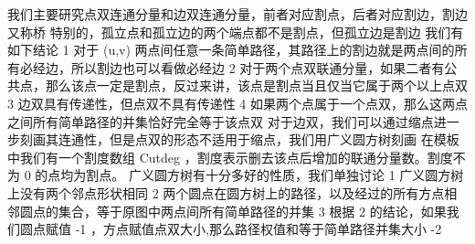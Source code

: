 {}
\markdownRendererSectionEnd 
\markdownRendererSectionEnd \markdownRendererSectionBegin
{}\markdownRendererInterblockSeparator
{}我们主要研究点双连通分量和边双连通分量，前者对应割点，后者对应割边，割边又称桥\markdownRendererParagraphSeparator
{}特别的，孤立点和孤立边的两个端点都不是割点，但孤立边是割边\markdownRendererParagraphSeparator
{}我们有如下结论\markdownRendererParagraphSeparator
{}\markdownRendererDollarSign{} 1 \markdownRendererDollarSign{}对于\markdownRendererDollarSign{} (u,v) \markdownRendererDollarSign{}两点间任意一条简单路径，其路径上的割边就是两点间的所有必经边，所以割边也可以看做必经边\markdownRendererParagraphSeparator
{}\markdownRendererDollarSign{} 2 \markdownRendererDollarSign{}对于两个点双联通分量，如果二者有公共点，那么该点一定是割点，反过来讲，该点是割点当且仅当它属于两个以上点双\markdownRendererParagraphSeparator
{}\markdownRendererDollarSign{} 3 \markdownRendererDollarSign{}边双具有传递性，但点双不具有传递性\markdownRendererParagraphSeparator
{}\markdownRendererDollarSign{} 4 \markdownRendererDollarSign{}如果两个点属于一个点双，那么这两点之间所有简单路径的并集恰好完全等于该点双\markdownRendererParagraphSeparator
{}对于边双，我们可以通过缩点进一步刻画其连通性，但是点双的形态不适用于缩点，我们用广义圆方树刻画\markdownRendererInterblockSeparator
{}\markdownRendererSectionBegin
{}\markdownRendererInterblockSeparator
{}在模板中我们有一个割度数组\markdownRendererDollarSign{} Cutdeg \markdownRendererDollarSign{}，割度表示删去该点后增加的联通分量数。割度不为\markdownRendererDollarSign{} 0 \markdownRendererDollarSign{}的点均为割点。\markdownRendererInterblockSeparator
{}\markdownRendererInterblockSeparator
{}广义圆方树有十分多好的性质，我们单独讨论\markdownRendererParagraphSeparator
{}\markdownRendererDollarSign{} 1 \markdownRendererDollarSign{}广义圆方树上没有两个邻点形状相同\markdownRendererParagraphSeparator
{}\markdownRendererDollarSign{} 2 \markdownRendererDollarSign{}两个圆点在圆方树上的路径，以及经过的所有方点相邻圆点的集合，等于原图中两点间所有简单路径的并集\markdownRendererParagraphSeparator
{}\markdownRendererDollarSign{} 3 \markdownRendererDollarSign{}根据\markdownRendererDollarSign{} 2 \markdownRendererDollarSign{}的结论，如果我们圆点赋值\markdownRendererDollarSign{} -1 \markdownRendererDollarSign{}，方点赋值点双大小,那么路径权值和等于简单路径并集大小\markdownRendererDollarSign{} -2 \markdownRendererDollarSign{}\markdownRendererInterblockSeparator
